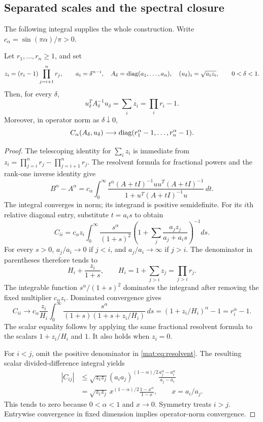 \subsection{Separated scales and the spectral closure}
The following integral supplies the whole construction.
Write $c_\alpha=\sin(\pi\alpha)/\pi>0$.

\begin{lemma}\label{mat:lem:scales}
Let $r_1,\ldots,r_n\ge1$, and set
\[
 z_i=(r_i-1)\prod_{j=i+1}^n r_j,\qquad
 a_i=\delta^{n-i},\quad
 A_\delta=\operatorname{diag}(a_1,\ldots,a_n),\quad
 (u_\delta)_i=\sqrt{a_i z_i},\qquad 0<\delta<1.
\]
Then, for every $\delta$,
\[
 u_\delta^TA_\delta^{-1}u_\delta
    =\sum_i z_i=\prod_i r_i-1.
\]
Moreover, in operator norm as $\delta\downarrow0$,
\[
 C_\alpha(A_\delta,u_\delta)
       \longrightarrow\operatorname{diag}(r_1^\alpha-1,\ldots,r_n^\alpha-1).
\]
\end{lemma}
\begin{proof}
The telescoping identity for $\sum_i z_i$ is immediate from
$z_i=\prod_{j=i}^n r_j-\prod_{j=i+1}^n r_j$.
The resolvent formula for fractional powers and the rank-one inverse
identity give
\begin{equation}\label{mat:eq:resolvent}
 B^\alpha-A^\alpha
 =c_\alpha\int_0^\infty
 \frac{t^\alpha(A+tI)^{-1}uu^T(A+tI)^{-1}}
 {1+u^T(A+tI)^{-1}u}\,dt.
\end{equation}
The integral converges in norm; its integrand is positive semidefinite.
For its $i$th relative diagonal entry, substitute $t=a_i s$ to obtain
\begin{equation}\label{mat:eq:diag}
 C_{ii}=c_\alpha z_i\int_0^\infty
 \frac{s^\alpha}{(1+s)^2}
 \left(1+\sum_j\frac{a_jz_j}{a_j+a_i s}\right)^{-1}ds.
\end{equation}
For every $s>0$, $a_j/a_i\to0$ if $j<i$, and $a_j/a_i\to\infty$
if $j>i$. The denominator in parentheses therefore tends to
\[
 H_i+\frac{z_i}{1+s},\qquad
 H_i=1+\sum_{j>i}z_j=\prod_{j>i}r_j.
\]
The integrable function $s^\alpha/(1+s)^2$ dominates the integrand
after removing the fixed multiplier $c_\alpha z_i$. Dominated
convergence gives
\[
 C_{ii}\longrightarrow
 c_\alpha\frac{z_i}{H_i}
    \int_0^\infty\frac{s^\alpha}{(1+s)(1+s+z_i/H_i)}\,ds
 = (1+z_i/H_i)^\alpha-1=r_i^\alpha-1.
\]
The scalar equality follows by applying the same fractional resolvent
formula to the scalars $1+z_i/H_i$ and $1$. It also holds when $z_i=0$.

For $i<j$, omit the positive denominator in \eqref{mat:eq:resolvent}.
The resulting scalar divided-difference integral yields
\begin{align*}
 |C_{ij}|
 &\le\sqrt{z_i z_j}(a_i a_j)^{(1-\alpha)/2}
                  \frac{a_j^\alpha-a_i^\alpha}{a_j-a_i}\\
 &=\sqrt{z_i z_j}\,x^{(1-\alpha)/2}
                    \frac{1-x^\alpha}{1-x},\qquad x=a_i/a_j.
\end{align*}
This tends to zero because $0<\alpha<1$ and $x\to0$.
Symmetry treats $i>j$. Entrywise convergence in fixed dimension implies
operator-norm convergence.
\end{proof}

